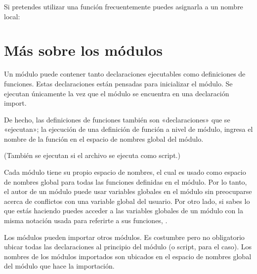 \documentclass[a5paper,10pt,spanish]{sphinxmanual}
\begin{document}
\sphinxAtStartPar
Si pretendes utilizar una función frecuentemente puedes asignarla a un nombre local:

\begin{sphinxVerbatim}[commandchars=\\\{\}]
  
\end{sphinxVerbatim}


\section{Más sobre los módulos}
\label{\detokenize{tutorial/modules:more-on-modules}}\label{\detokenize{tutorial/modules:tut-moremodules}}
\sphinxAtStartPar
Un módulo puede contener tanto declaraciones ejecutables como definiciones de funciones. Estas declaraciones están pensadas para inicializar el módulo. Se ejecutan únicamente la  vez que el módulo se encuentra en una declaración import. %
\begin{footnote}[1]\sphinxAtStartFootnote
De hecho, las definiciones de funciones también son «declaraciones» que se «ejecutan»; la ejecución de una definición de función a nivel de módulo, ingresa el nombre de la función en el espacio de nombres global del módulo.
%
\end{footnote} (También se ejecutan si el archivo se ejecuta como script.)

\sphinxAtStartPar
Cada módulo tiene su propio espacio de nombres, el cual es usado como espacio de nombres global para todas las funciones definidas en el módulo. Por lo tanto, el autor de un módulo puede usar variables globales en el módulo sin preocuparse acerca de conflictos con una variable global del usuario. Por otro lado, si sabes lo que estás haciendo puedes acceder a las variables globales de un módulo con la misma notación usada para referirte a sus funciones, .

\sphinxAtStartPar
Los módulos pueden importar otros módulos. Es costumbre pero no obligatorio ubicar todas las declaraciones  al principio del módulo (o script, para el caso). Los nombres de los módulos importados son ubicados en el espacio de nombres global del módulo que hace la importación.
\end{document}
